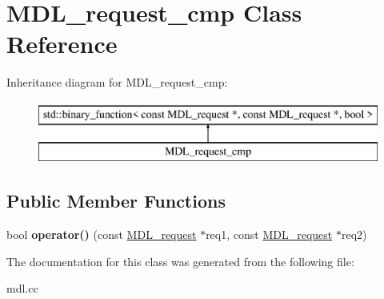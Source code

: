 \hypertarget{classMDL__request__cmp}{}\section{M\+D\+L\+\_\+request\+\_\+cmp Class Reference}
\label{classMDL__request__cmp}
Inheritance diagram for M\+D\+L\+\_\+request\+\_\+cmp\+:\begin{figure}[H]
\begin{center}
\leavevmode
\includegraphics[height=2.000000cm]{classMDL__request__cmp}
\end{center}
\end{figure}
\subsection*{Public Member Functions}
\begin{DoxyCompactItemize}
\item 
\mbox{\label{classMDL__request__cmp_a90594383883667188aa283422c3dd58d}} 
bool {\bfseries operator()} (const \mbox{\hyperlink{classMDL__request}{M\+D\+L\+\_\+request}} $\ast$req1, const \mbox{\hyperlink{classMDL__request}{M\+D\+L\+\_\+request}} $\ast$req2)
\end{DoxyCompactItemize}


The documentation for this class was generated from the following file\+:\begin{DoxyCompactItemize}
\item 
mdl.\+cc\end{DoxyCompactItemize}
